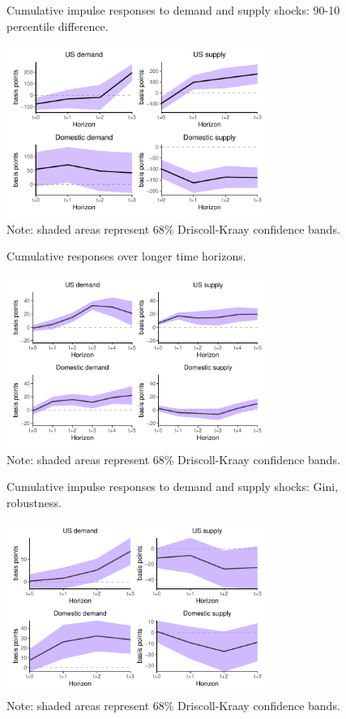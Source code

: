 \documentclass[12pt, a4paper]{article}
\begin{document}
\begin{figure}[H]
    \centering
    \caption{Cumulative impulse responses to demand and supply shocks: 90-10 percentile difference.}
    \label{fig:9010_demand_supply}
    \includegraphics[width=0.75\textwidth]{Figures/p9010_demand_supply_LP.pdf}
    \centering \caption*{Note: shaded areas represent 68\% Driscoll-Kraay confidence bands.}
\end{figure}

\begin{figure}[H]
    \caption{Cumulative responses over longer time horizons.}
    \label{fig:irf_longer}
    \centering
    \includegraphics[width=0.75\textwidth]{Figures/baseline_demand_supply_LP5.pdf}
    \caption*{Note: shaded areas represent 68\% Driscoll-Kraay confidence bands.}
\end{figure}

\begin{figure}[H]
    \centering
    \caption{Cumulative impulse responses to demand and supply shocks: Gini, robustness.}
    \label{fig:demand_supply_robust}
    \includegraphics[width=0.75\textwidth]{Figures/robust_demand_supply_LP_extended.pdf}
    \centering \caption*{Note: shaded areas represent 68\% Driscoll-Kraay confidence bands.}
\end{figure}
\end{document}

